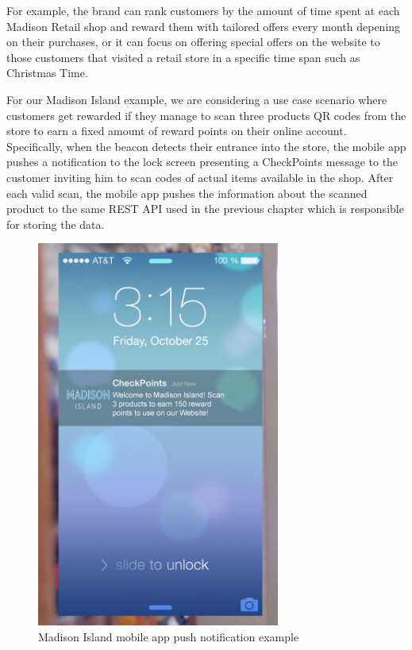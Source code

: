For example, the brand can rank customers by the amount of time spent at each Madison Retail shop and reward them with tailored offers every month depening on their purchases, or it can focus on offering special offers on the website to those customers that visited a retail store in a specific time span such as Christmas Time.

For our Madison Island example, we are considering a use case scenario where customers get rewarded if they manage to scan three products QR codes from the store to earn a fixed amount of reward points on their online account. Specifically, when the beacon detects their entrance into the store, the mobile app pushes a notification to the lock screen presenting a CheckPoints message to the customer inviting him to scan codes of actual items available in the shop. After each valid scan, the mobile app pushes the information about the scanned product to the same REST API used in the previous chapter which is responsible for storing the data.

\vspace{0.5cm}
\begin{figure}[H]
  \centering
    \includegraphics[width=8cm]{images/madison-push-reward-points.jpg}
  \caption{Madison Island mobile app push notification example}
  \label{fig:retail-map}
\end{figure}
\vspace{0.5cm}


